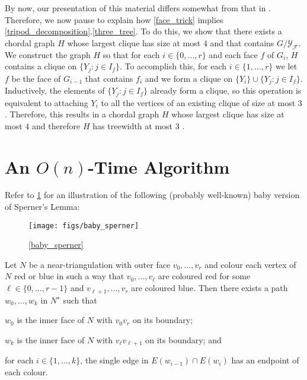 \documentclass{patmorin}
\begin{document}
By now, our presentation of this material differs somewhat from that in \cite{dujmovic.joret.ea:planar,ueckerdt.wood.ea:improved}.  Therefore, we now pause to explain how \cref{face_trick} implies \cref{tripod_decomposition}.\ref{three_tree}.  To do this, we show that there exists a chordal graph $H$ whose largest clique has size at most $4$ and that contains $G/\mathcal{Y_F}$. We construct the graph $H$ so that for each $i\in\{0,\ldots,r\}$ and each face $f$ of $G_i$, $H$ contains a clique on $\{Y_j:j\in I_f\}$. To accomplish this, for each $i\in\{1,\ldots,r\}$ we let $f$ be the face of $G_{i-1}$ that contains $f_i$ and we form a clique on $\{Y_i\}\cup\{Y_j:j\in I_f\}$.  Inductively, the elements of $\{Y_j:j\in I_f\}$ already form a clique, so this operation is equivalent to attaching $Y_i$ to all the vertices of an existing clique of size at most $3$. Therefore, this results in a chordal graph $H$ whose largest clique has size at most $4$ and therefore $H$ has treewidth at most $3$ \cite{gavril:intersection}.

\section{An $O(n)$-Time Algorithm}
\label{linear_time_algorithm}\label{algorithm}

Refer to \cref{baby_sperner_fig} for an illustration of the following (probably well-known) baby version of Sperner's Lemma:

\begin{figure}
  \begin{center}
    \texttt{[image: figs/baby\_sperner]}
  \end{center}
  \caption{\cref{baby_sperner}}
  \label{baby_sperner_fig}
\end{figure}

\begin{lem}\label{baby_sperner}
  Let $N$ be a near-triangulation with outer face $v_0,\ldots,v_r$ and colour each vertex of $N$ red or blue in such a way that $v_0,\ldots,v_\ell$ are coloured red for some $\ell\in\{0,\ldots,r-1\}$ and $v_{\ell+1},\ldots,v_r$ are coloured blue.  Then there exists a path $w_0,\ldots,w_k$ in $N^\star$ such that
  \begin{compactenum}
    \item $w_0$ is the inner face of $N$ with $v_0v_r$ on its boundary;
    \item $w_k$ is the inner face of $N$ with $v_{\ell}v_{\ell+1}$ on its boundary; and
    \item for each $i\in\{1,\ldots,k\}$, the single edge in $E(w_{i-1})\cap E(w_i)$ has an endpoint of each colour.
  \end{compactenum}
\end{lem}
\end{document}
